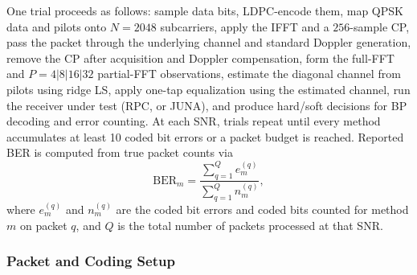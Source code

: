 \documentclass{wileysev}
\begin{document}
	One trial proceeds as follows: sample data bits, LDPC-encode them, map QPSK data and pilots onto \(N=2048\) subcarriers, apply the IFFT and a \(256\)-sample CP, pass the packet through the underlying channel and standard Doppler generation, remove the CP after acquisition and Doppler compensation, form the full-FFT and \(P=4|8|16|32\) partial-FFT observations, estimate the diagonal channel from pilots using ridge LS, apply one-tap equalization using the estimated channel, run the receiver under test (RPC, or JUNA), and produce hard/soft decisions for BP decoding and error counting. At each SNR, trials repeat until every method accumulates at least 10 coded bit errors or a packet budget is reached. Reported BER is computed from true packet counts via
	\begin{equation}
		\mathrm{BER}_m
		=
		\frac{\sum_{q=1}^{Q} e_m^{(q)}}{\sum_{q=1}^{Q} n_m^{(q)}},
		\label{eq:packet_ber_aggregate}
	\end{equation}
	where \(e_m^{(q)}\) and \(n_m^{(q)}\) are the coded bit errors and coded bits counted for method \(m\) on packet \(q\), and \(Q\) is the total number of packets processed at that SNR.
	
	\subsubsection{Packet and Coding Setup}
	
\end{document}
